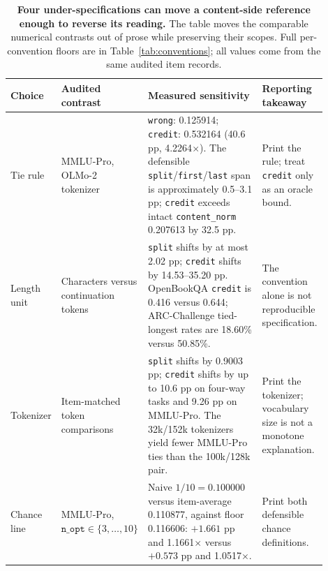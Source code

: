 \begin{table}[!htbp]
\centering
\small
\setlength{\tabcolsep}{3.2pt}
\begin{tabular}{>{\raggedright\arraybackslash}p{0.14\linewidth}>{\raggedright\arraybackslash}p{0.22\linewidth}>{\raggedright\arraybackslash}p{0.38\linewidth}>{\raggedright\arraybackslash}p{0.16\linewidth}}
\toprule
Choice & Audited contrast & Measured sensitivity & Reporting takeaway \\
\midrule
Tie rule & MMLU-Pro, OLMo-2 tokenizer
& \texttt{wrong}: 0.125914; \texttt{credit}: 0.532164 (40.6 pp, 4.2264$\times$).  The defensible \texttt{split}/\texttt{first}/\texttt{last} span is approximately 0.5--3.1 pp; \texttt{credit} exceeds intact \texttt{content\_norm} 0.207613 by 32.5 pp.
& Print the rule; treat \texttt{credit} only as an oracle bound. \\
Length unit & Characters versus continuation tokens
& \texttt{split} shifts by at most 2.02 pp; \texttt{credit} shifts by 14.53--35.20 pp.  OpenBookQA \texttt{credit} is 0.416 versus 0.644; ARC-Challenge tied-longest rates are 18.60\% versus 50.85\%.
& The convention alone is not reproducible specification. \\
Tokenizer & Item-matched token comparisons
& \texttt{split} shifts by 0.9003 pp; \texttt{credit} shifts by up to 10.6 pp on four-way tasks and 9.26 pp on MMLU-Pro.  The 32k/152k tokenizers yield fewer MMLU-Pro ties than the 100k/128k pair.
& Print the tokenizer; vocabulary size is not a monotone explanation. \\
Chance line & MMLU-Pro, $\texttt{n\_opt}\in\{3,\ldots,10\}$
& Naive $1/10=0.100000$ versus item-average 0.110877, against floor 0.116606: $+1.661$ pp and 1.1661$\times$ versus $+0.573$ pp and 1.0517$\times$.
& Print both defensible chance definitions. \\
\bottomrule
\end{tabular}
\caption{\textbf{Four under-specifications can move a content-side reference enough to reverse its reading.} The table moves the comparable numerical contrasts out of prose while preserving their scopes. Full per-convention floors are in Table~\ref{tab:conventions}; all values come from the same audited item records.}
\label{tab:reference-degrees}
\end{table}
